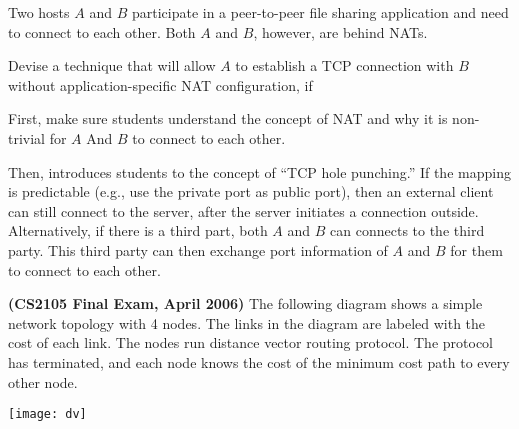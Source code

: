 \documentclass[a4paper,11pt]{exam}
\begin{document}
\begin{questions}
	\question 
	Two hosts $A$ and $B$ participate in a peer-to-peer file
	sharing application and need to connect to each other.
	Both $A$ and $B$, however, are behind NATs. 

	Devise a technique
	that will allow $A$ to establish a TCP connection with
	$B$ without application-specific NAT configuration, if  

	\begin{solution}
		First, make sure students understand the concept of NAT
		and why it is non-trivial for $A$ And $B$ to connect to
		each other.

		Then, introduces students to the concept of 
		``TCP hole punching.''  If the mapping is predictable
		(e.g., use the private port as public port), then an
		external client can still connect to the server, after
		the server initiates a connection outside.  Alternatively,
		if there is a third part, both $A$ and $B$ can connects
		to the third party.  This third party can then exchange
		port information of $A$ and $B$ for them to connect to
		each other.

	\end{solution}


	\question \textbf{(CS2105 Final Exam, April 2006)}
	The following diagram shows a simple network topology with 4 nodes.
	The links in the diagram are labeled with the cost of each link. 
	The nodes run distance vector routing protocol.  The protocol has
	terminated, and each node knows the cost of the minimum cost path
	to every other node.

		\vspace{2mm}
    \centerline{
        \texttt{[image: dv]}
    }

\end{questions}
\end{document}

